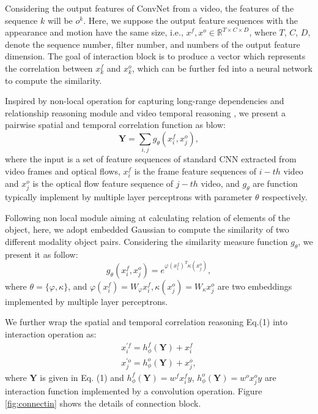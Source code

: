 \documentclass[conference,compsoc]{IEEEtran}
\begin{document}
Considering the output features of ConvNet from a video, the features of the sequence $k$ will be $o^{k}$. Here, we suppose the output feature sequences with the appearance and motion have the same size, i.e., $x^{f}, x^{o} \in\mathbb{R}^{ T\times C \times D }$, where $T$, $C$, $D$, denote the sequence number, filter number, and numbers of the output feature dimension. The goal of interaction block is to produce a vector which represents the correlation between $x_{k}^{f}$ and $x_{k}^{o}$, which can be further fed into a neural network to compute the similarity.

Inspired by non-local operation for capturing long-range dependencies \cite{wang2018non} and relationship reasoning module \cite{santoro2017simple} and video temporal reasoning \cite{zhou2018temporal}, we present a pairwise spatial and temporal correlation function as blow:
\begin{equation}
    \mathbf{Y} = \sum_{i, j} g_{\theta}\left(x_{i}^{f}, x_{j}^{o}\right),
\end{equation}
where the input is a set of feature sequences of standard CNN extracted from video frames and optical flows, $x_{i}^{f}$ is the frame feature sequences of $i-th$ video and $x_{j}^{o}$ is the optical flow feature sequence of $j-th$ video, and  $g_{\theta}$ are function typically implement by multiple layer perceptrons with parameter $\theta$ respectively.

Following non local module \cite{wang2018non} aiming at calculating relation of elements of the object, here, we adopt embedded Gaussian to compute the similarity of two different modality object pairs.  Considering the similarity measure function $g_{\theta}$, we present it as follow:
\begin{equation}
    g_{\theta}(x_{i}^{f}, x_{j}^{o}) = e^{\varphi(x_{i}^{f})^{T} \kappa(x_{j}^{o})},
\end{equation}
where $ \theta = \{\varphi, \kappa \}$, and $ \varphi(x_{i}^{f})=W_{\varphi}x_{i}^{f}, \kappa(x_{j}^{o})=W_{\kappa}x_{j}^{o} $ are two embeddings implemented by multiple layer perceptrons.

We further wrap the spatial and temporal correlation reasoning Eq.(1) into interaction operation as:
\begin{equation}
      \begin{array}{l} x_{i}^{\prime f} = h_{\phi}^{f}\left(\mathbf{Y}\right) + x_{i}^{f} \\
 x_{j}^{\prime o} = h_{\phi}^{o}\left(\mathbf{Y}\right) + x_{j}^{o}, \end{array}
\end{equation}
where $\mathbf{Y}$ is given in Eq. (1) and $h_{\phi}^{f}\left(\mathbf{Y}\right) = w^{f}x_{i}^{f}y$, $h_{\phi}^{o}\left(\mathbf{Y}\right) = w^{o}x_{j}^{o}y$ are interaction function implemented by a convolution operation. Figure \ref{fig:connectin} shows the details of connection block.
\end{document}
